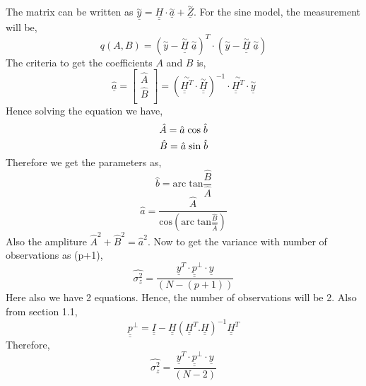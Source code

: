 \noindent The matrix can be written as $\underline{\overset{\sim}{y}} = \underline{\underline{H}} \cdot \underline{\overset{\sim}{a}} + \underline{\overset{\sim}{Z}}$. For the sine model, the measurement will be,
$$ q(A,B) = (\overset{\sim}{y} - \underline{\underline{\overset{\sim}{H}}}\; \underline{\overset{\sim}{a}})^T \cdot (\overset{\sim}{y} - \underline{\underline{\overset{\sim}{H}}}\; \underline{\overset{\sim}{a}})$$
\noindent The criteria to get the coefficients $A$ and $B$ is,
\[
{\underline{\hat{a}}} =
\begin{bmatrix}
\hat{A} \\
\hat{B} \\
\end{bmatrix}
=
(  \overset{\sim}{\underline{\underline{H}}^T}   \cdot \overset{\sim}{\underline{\underline{H}}})^{-1} \cdot  \overset{\sim}{\underline{\underline{H}}^T} \cdot \underline{\overset{\sim}{y}}
\]
\noindent Hence solving the equation we have,
$$ \hat{A} = \hat{a}\;\text{cos}\;\hat{b}\\$$
$$ \hat{B} = \hat{a}\;\text{sin}\;\hat{b}\\$$
\noindent Therefore we get the parameters as,
$$\hat{b} = \text{arc}\;\text{tan}\frac{\hat{B}}{\hat{A}}$$
$$\hat{a} = \frac{\hat{A}}{\text{cos}(\text{arc}\;\text{tan}\frac{\hat{B}}{\hat{A}})}$$
\noindent Also the ampliture ${\hat{A}}^2 + {\hat{B}}^2 = {\hat{a}}^2$. Now to get the variance with number of observations as (p+1),
$$\hat{\sigma_z^2} = \frac{\underline{y}^T\cdot \underline{\underline{p}}^{\bot}\cdot \underline{y}}{(N- (p+1))}$$
\noindent Here also we have 2 equations. Hence, the number of observations will be 2. Also from section 1.1,
$$\underline{\underline{p}}^{\bot} = \underline{\underline{I}} - \underline{\underline{H}}(\underline{\underline{H}}^T.\underline{\underline{H}})^{-1}\underline{\underline{H}}^T$$
\noindent Therefore,
$$\hat{\sigma_z^2} = \frac{\underline{y}^T\cdot \underline{\underline{p}}^{\bot}\cdot \underline{y}}{(N-2)}$$

